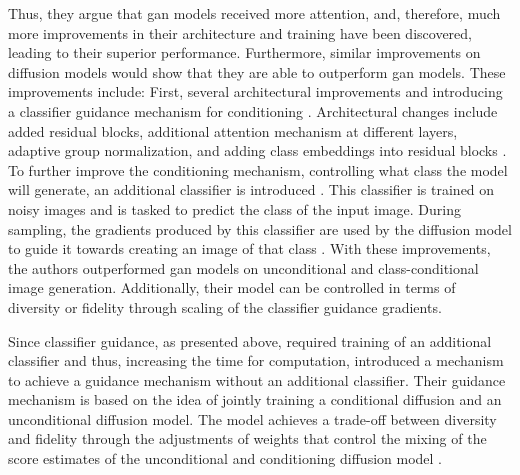 Thus, they argue that \gls{gan} models received more attention, and, therefore, much more improvements in their architecture and training have been discovered, leading to their superior performance.
Furthermore, similar improvements on diffusion models would show that they are able to outperform \gls{gan} models.
These improvements include:
First, several architectural improvements \cite[section 3]{dhariwal2021DiffusionModelsBeat} and introducing a classifier guidance mechanism for conditioning \cite[section 4]{dhariwal2021DiffusionModelsBeat}.
Architectural changes include added residual blocks, additional attention mechanism at different layers, adaptive group normalization, and adding class embeddings into residual blocks \cite{dhariwal2021DiffusionModelsBeat}.
To further improve the conditioning mechanism, \ie controlling what class the model will generate, an additional classifier is introduced \cite{dhariwal2021DiffusionModelsBeat}. 
This classifier is trained on noisy images and is tasked to predict the class of the input image.
During sampling, the gradients produced by this classifier are used by the diffusion model to guide it towards creating an image of that class \cite{dhariwal2021DiffusionModelsBeat}.
With these improvements, the authors outperformed \gls{gan} models on unconditional and class-conditional image generation.
Additionally, their model can be controlled in terms of diversity or fidelity through scaling of the classifier guidance gradients.

Since classifier guidance, as presented above, required training of an additional classifier and thus, increasing the time for computation, \cite{ho2022ClassifierFreeDiffusionGuidance}
introduced a mechanism to achieve a guidance mechanism without an additional classifier.  
Their guidance mechanism is based on the idea of jointly training a conditional diffusion and an unconditional diffusion model.
The model achieves a trade-off between diversity and fidelity through the adjustments of weights that control the mixing of the score estimates of the unconditional and conditioning diffusion model \cite{ho2022ClassifierFreeDiffusionGuidance}.

